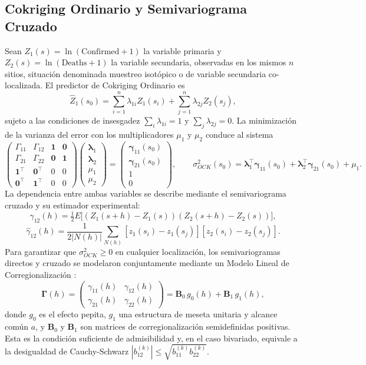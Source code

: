 \documentclass[12pt,a4paper]{article}
\newcommand{\lnC}{\ln(\text{Confirmed}+1)}
\newcommand{\lnD}{\ln(\text{Deaths}+1)}
\begin{document}
\subsection{Cokriging Ordinario y Semivariograma Cruzado}

Sean $Z_1(s)=\lnC$ la variable primaria y $Z_2(s)=\lnD$ la variable secundaria, observadas en los mismos $n$ sitios, situación denominada muestreo isotópico o de variable secundaria co-localizada. El predictor de Cokriging Ordinario es
\[
\hat Z_1(s_0)=\sum_{i=1}^{n}\lambda_{1i}Z_1(s_i)+\sum_{j=1}^{n}\lambda_{2j}Z_2(s_j),
\]
sujeto a las condiciones de insesgadez $\sum_i\lambda_{1i}=1$ y $\sum_j\lambda_{2j}=0$. La minimización de la varianza del error con los multiplicadores $\mu_1$ y $\mu_2$ conduce al sistema
\[
\begin{pmatrix}\Gamma_{11}&\Gamma_{12}&\mathbf 1&\mathbf 0\\\Gamma_{21}&\Gamma_{22}&\mathbf 0&\mathbf 1\\\mathbf 1^\top&\mathbf 0^\top&0&0\\\mathbf 0^\top&\mathbf 1^\top&0&0\end{pmatrix}
\begin{pmatrix}\bm\lambda_1\\\bm\lambda_2\\\mu_1\\\mu_2\end{pmatrix}=
\begin{pmatrix}\bm\gamma_{11}(s_0)\\\bm\gamma_{21}(s_0)\\1\\0\end{pmatrix},\qquad
\sigma^2_{OCK}(s_0)=\bm\lambda_1^\top\bm\gamma_{11}(s_0)+\bm\lambda_2^\top\bm\gamma_{21}(s_0)+\mu_1.
\]
La dependencia entre ambas variables se describe mediante el semivariograma cruzado y su estimador experimental:
\[
\gamma_{12}(h)=\tfrac12 E\big[(Z_1(s+h)-Z_1(s))(Z_2(s+h)-Z_2(s))\big],
\]
\[
\hat\gamma_{12}(h)=\frac{1}{2|N(h)|}\sum_{N(h)}[z_1(s_i)-z_1(s_j)][z_2(s_i)-z_2(s_j)].
\]
Para garantizar que $\sigma^2_{OCK}\ge0$ en cualquier localización, los semivariogramas directos y cruzado se modelaron conjuntamente mediante un Modelo Lineal de Corregionalización \citep{goulard1992,wackernagel2003}:
\[
\bm\Gamma(h)=\begin{pmatrix}\gamma_{11}(h)&\gamma_{12}(h)\\\gamma_{21}(h)&\gamma_{22}(h)\end{pmatrix}=\mathbf B_0\,g_0(h)+\mathbf B_1\,g_1(h),
\]
donde $g_0$ es el efecto pepita, $g_1$ una estructura de meseta unitaria y alcance común $a$, y $\mathbf B_0$ y $\mathbf B_1$ son matrices de corregionalización semidefinidas positivas. Esta es la condición suficiente de admisibilidad y, en el caso bivariado, equivale a la desigualdad de Cauchy-Schwarz $|b^{(k)}_{12}|\le\sqrt{b^{(k)}_{11}b^{(k)}_{22}}$.
\end{document}
